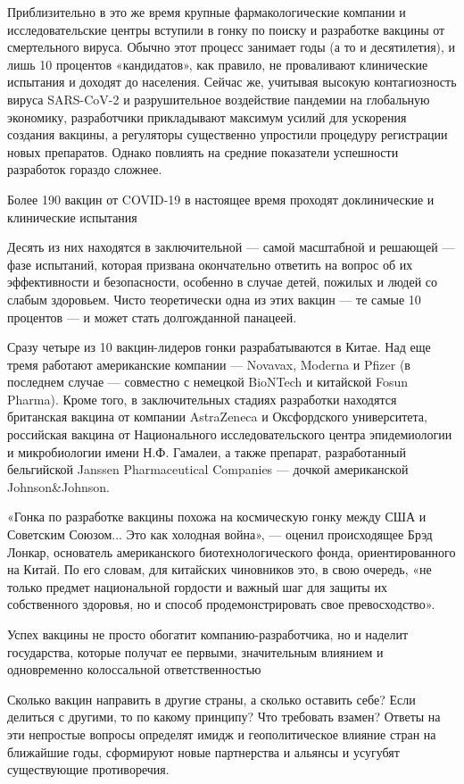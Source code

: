 Приблизительно в это же время крупные фармакологические компании и
исследовательские центры вступили в гонку по поиску и разработке вакцины от
смертельного вируса. Обычно этот процесс занимает годы (а то и десятилетия), и
лишь 10 процентов «кандидатов», как правило, не проваливают клинические
испытания и доходят до населения. Сейчас же, учитывая высокую контагиозность
вируса SARS-CoV-2 и разрушительное воздействие пандемии на глобальную
экономику, разработчики прикладывают максимум усилий для ускорения создания
вакцины, а регуляторы существенно упростили процедуру регистрации новых
препаратов. Однако повлиять на средние показатели успешности разработок гораздо
сложнее.

Более 190 вакцин от COVID-19 в настоящее время проходят доклинические и
клинические испытания

Десять из них находятся в заключительной --- самой масштабной и решающей --- фазе
испытаний, которая призвана окончательно ответить на вопрос об их эффективности
и безопасности, особенно в случае детей, пожилых и людей со слабым здоровьем.
Чисто теоретически одна из этих вакцин --- те самые 10 процентов --- и может стать
долгожданной панацеей.

Сразу четыре из 10 вакцин-лидеров гонки разрабатываются в Китае. Над еще тремя
работают американские компании --- Novavax, Moderna и Pfizer (в последнем случае
--- совместно с немецкой BioNTech и китайской Fosun Pharma). Кроме того, в
заключительных стадиях разработки находятся британская вакцина от компании
AstraZeneca и Оксфордского университета, российская вакцина от Национального
исследовательского центра эпидемиологии и микробиологии имени Н.Ф. Гамалеи, а
также препарат, разработанный бельгийской Janssen Pharmaceutical Companies —
дочкой американской Johnson\&Johnson.

«Гонка по разработке вакцины похожа на космическую гонку между США и Советским
Союзом... Это как холодная война», --- оценил происходящее Брэд Лонкар,
основатель американского биотехнологического фонда, ориентированного на Китай.
По его словам, для китайских чиновников это, в свою очередь, «не только предмет
национальной гордости и важный шаг для защиты их собственного здоровья, но и
способ продемонстрировать свое превосходство».

Успех вакцины не просто обогатит компанию-разработчика, но и наделит
государства, которые получат ее первыми, значительным влиянием и одновременно
колоссальной ответственностью

Сколько вакцин направить в другие страны, а сколько оставить себе? Если
делиться с другими, то по какому принципу? Что требовать взамен? Ответы на эти
непростые вопросы определят имидж и геополитическое влияние стран на ближайшие
годы, сформируют новые партнерства и альянсы и усугубят существующие
противоречия.

